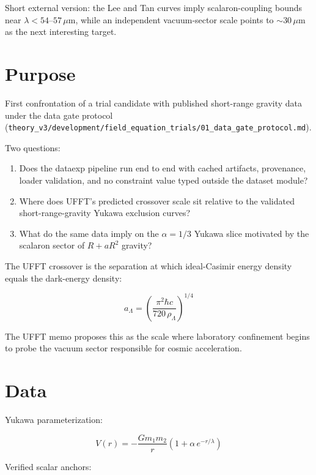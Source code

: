 \documentclass{article}
\begin{document}
Short external version: the Lee and Tan curves imply scalaron-coupling bounds
near $\lambda<54$--$57\,\mu$m, while an independent vacuum-sector scale points
to $\sim30\,\mu$m as the next interesting target.

\section{Purpose}

First confrontation of a trial candidate with published short-range gravity
data under the data gate protocol
(\texttt{theory\_v3/development/field\_equation\_trials/01\_data\_gate\_protocol.md}).

Two questions:

\begin{enumerate}
\item Does the dataexp pipeline run end to end with cached artifacts,
   provenance, loader validation, and no constraint value typed outside the
   dataset module?
\item Where does UFFT's predicted crossover scale sit relative to the validated
   short-range-gravity Yukawa exclusion curves?
\item What do the same data imply on the $\alpha=1/3$ Yukawa slice motivated by
   the scalaron sector of $R+aR^2$ gravity?
\end{enumerate}

The UFFT crossover is the separation at which ideal-Casimir energy density
equals the dark-energy density:

\begin{equation}
a_\Lambda=\left(\frac{\pi^2\hbar c}{720\,\rho_\Lambda}\right)^{1/4}
\end{equation}

The UFFT memo proposes this as the scale where laboratory confinement begins
to probe the vacuum sector responsible for cosmic acceleration.

\section{Data}

Yukawa parameterization:

\begin{equation}
V(r)=-\frac{Gm_1m_2}{r}\left(1+\alpha\,e^{-r/\lambda}\right)
\end{equation}

Verified scalar anchors:
\end{document}
